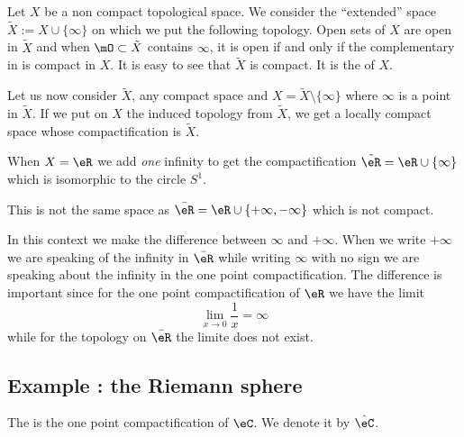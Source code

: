 Let $X$ be a non compact topological space. We consider the ``extended'' space $\tilde X:=X\cup\{ \infty\}$ on which we put the following topology. Open sets of $X$ are open in $\tilde X$ and when $\mO\subset\tilde X$ contains $\infty$, it is open if and only if the complementary in is compact in $X$. It is easy to see that $\tilde X$ is compact. It is the  of $X$.

Let us now consider $\tilde X$, any compact space and $X=\tilde X\setminus\{\infty\}$ where $\infty$ is a point in $\tilde X$. If we put on $X$ the induced topology from $\tilde X$, we get a locally compact space whose compactification is $\tilde X$.

\begin{example}
    When \( X=\eR\) we add \emph{one} infinity to get the compactification \( \tilde \eR=\eR\cup\{ \infty \}\) which is isomorphic to the circle \( S^1\). 

    This is not the same space as \( \bar \eR=\eR\cup\{ +\infty,-\infty \}\) which is not compact.
\end{example}

In this context we make the difference between \( \infty\) and \( +\infty\). When we write \( +\infty\) we are speaking of the infinity in \( \bar \eR\) while writing \( \infty\) with no sign we are speaking about the infinity in the one point compactification. The difference is important since for the one point compactification of \( \eR\) we have the limit
\begin{equation}
    \lim_{x\to 0} \frac{1}{ x }=\infty
\end{equation}
while for the topology on \( \bar \eR\) the limite does not exist.

\subsection{Example : the Riemann sphere}

\begin{definition}
    The  is the one point compactification of \( \eC\). We denote it by \( \hat \eC\).
\end{definition}

